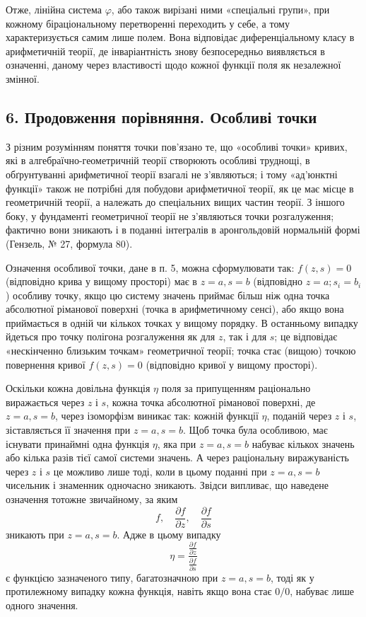 \documentclass[11pt]{article}
\providecommand{\p}{\partial}
\begin{document}
Отже, лінійна система \(\varphi\), або також вирізані ними «спеціальні групи», при кожному біраціональному перетворенні переходить у себе, а тому характеризується самим лише полем. Вона відповідає диференціальному класу в арифметичній теорії, де інваріантність знову безпосередньо виявляється в означенні, даному через властивості щодо кожної функції поля як незалежної змінної.

\subsection*{6. Продовження порівняння. Особливі точки}
З різним розумінням поняття точки пов'язано те, що «особливі точки» кривих, які в алгебраїчно-геометричній теорії створюють особливі труднощі, в обґрунтуванні арифметичної теорії взагалі не з'являються; і тому «ад'юнктні функції» також не потрібні для побудови арифметичної теорії, як це має місце в геометричній теорії, а належать до спеціальних вищих частин теорії. З іншого боку, у фундаменті геометричної теорії не з'являються точки розгалуження; фактично вони зникають і в поданні інтегралів в аронгольдовій нормальній формі (Гензель, № 27, формула 80).

Означення особливої точки, дане в п. 5, можна сформулювати так: \(f(z,s)=0\) (відповідно крива у вищому просторі) має в \(z=a,s=b\) (відповідно \(z=a; s_i=b_i\)) особливу точку, якщо цю систему значень приймає більш ніж одна точка абсолютної ріманової поверхні (точка в арифметичному сенсі), або якщо вона приймається в одній чи кількох точках у вищому порядку. В останньому випадку йдеться про точку полігона розгалуження як для \(z\), так і для \(s\); це відповідає «нескінченно близьким точкам» геометричної теорії; точка стає (вищою) точкою повернення кривої \(f(z,s)=0\) (відповідно кривої у вищому просторі).

Оскільки кожна довільна функція \(\eta\) поля за припущенням раціонально виражається через \(z\) і \(s\), кожна точка абсолютної ріманової поверхні, де \(z=a,s=b\), через ізоморфізм виникає так: кожній функції \(\eta\), поданій через \(z\) і \(s\), зіставляється її значення при \(z=a,s=b\). Щоб точка була особливою, має існувати принаймні одна функція \(\eta\), яка при \(z=a,s=b\) набуває кількох значень або кілька разів тієї самої системи значень. А через раціональну виражуваність через \(z\) і \(s\) це можливо лише тоді, коли в цьому поданні при \(z=a,s=b\) чисельник і знаменник одночасно зникають. Звідси випливає, що наведене означення тотожне звичайному, за яким
\[
f,\quad \frac{\p f}{\p z},\quad \frac{\p f}{\p s}
\]
зникають при \(z=a,s=b\). Адже в цьому випадку
\[
\eta=\frac{\frac{\p f}{\p z}}{\frac{\p f}{\p s}}
\]
є функцією зазначеного типу, багатозначною при \(z=a,s=b\), тоді як у протилежному випадку кожна функція, навіть якщо вона стає \(0/0\), набуває лише одного значення.
\end{document}
